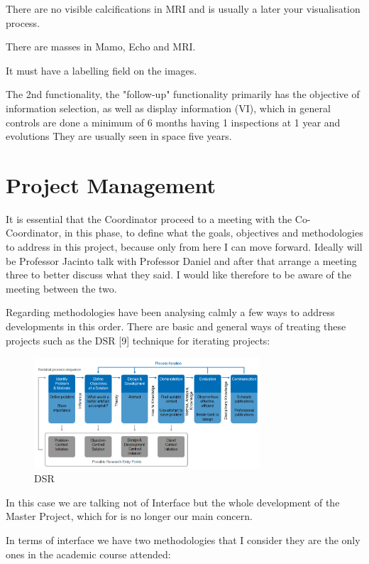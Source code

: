 There are no visible calcifications in MRI and is usually a later your visualisation process.

There are masses in Mamo, Echo and MRI.

It must have a labelling field on the images.

The 2nd functionality, the "follow-up" functionality primarily has the objective of information selection, as well as display information (VI), which in general controls are done a minimum of 6 months having 1 inspections at 1 year and evolutions They are usually seen in space five years.

\section{Project Management}

It is essential that the Coordinator proceed to a meeting with the Co-Coordinator, in this phase, to define what the goals, objectives and methodologies to address in this project, because only from here I can move forward. Ideally will be Professor Jacinto talk with Professor Daniel and after that arrange a meeting three to better discuss what they said. I would like therefore to be aware of the meeting between the two.

Regarding methodologies have been analysing calmly a few ways to address developments in this order. There are basic and general ways of treating these projects such as the DSR [9] technique for iterating projects:

\begin{figure}[!hbt]
\centering
\includegraphics[width=0.75\textwidth]{diss_goebel_2.png}
\caption{\label{fig:frog}DSR}
\end{figure}

In this case we are talking not of Interface but the whole development of the Master Project, which for is no longer our main concern.

In terms of interface we have two methodologies that I consider they are the only ones in the academic course attended:

